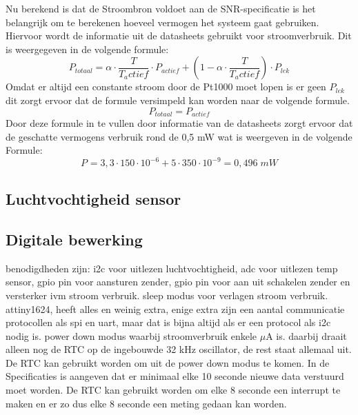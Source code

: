 Nu berekend is dat de Stroombron voldoet aan de SNR-specificatie is het belangrijk om te berekenen hoeveel vermogen het systeem gaat gebruiken. Hiervoor wordt de informatie uit de datasheets gebruikt voor stroomverbruik. Dit is weergegeven in de volgende formule:
\[
P_{totaal} = \alpha \cdot \frac{T}{T_actief} \cdot P_{actief} + (1-\alpha \cdot \frac{T}{T_actief}) \cdot P_{lek}
\]
Omdat er altijd een constante stroom door de Pt1000 moet lopen is er geen $P_{lek}$ dit zorgt ervoor dat de formule versimpeld kan worden naar de volgende formule.
\[
P_{totaal} = P_{actief}
\]
Door deze formule in te vullen door informatie van de datasheets \cite{LTC2055,Spannings_ref} zorgt ervoor dat de geschatte vermogens verbruik rond de 0,5 mW wat is weergeven in de volgende Formule:
\[
P_{\text{}} = 3,3 \cdot 150 \cdot 10^{-6} + 5 \cdot 350 \cdot 10^{-9} = 0,496 \; mW
\]

\subsection{Luchtvochtigheid sensor}


\subsection{Digitale bewerking}
benodigdheden zijn: i2c voor uitlezen luchtvochtigheid, adc voor uitlezen temp sensor, gpio pin voor aansturen zender, gpio pin voor aan uit schakelen zender en versterker ivm stroom verbruik. sleep modus voor verlagen stroom verbruik.
attiny1624, heeft alles en weinig extra, enige extra zijn een aantal communicatie protocollen als spi en uart, maar dat is bijna altijd als er een protocol als i2c nodig is.
power down modus waarbij stroomverbruik enkele $\mu$A is. daarbij draait alleen nog de RTC op de ingebouwde 32 kHz oscillator, de rest staat allemaal uit. De RTC kan gebruikt worden om uit de power down modus te komen. In de Specificaties is aangeven dat er minimaal elke 10 seconde nieuwe data verstuurd moet worden. De RTC kan gebruikt worden om elke 8 seconde een interrupt te maken en er zo dus elke 8 seconde een meting gedaan kan worden.



